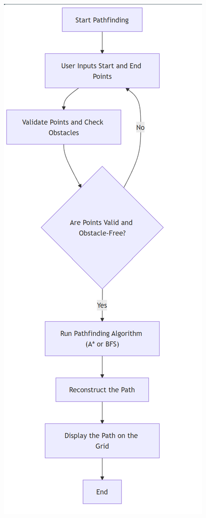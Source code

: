 \newpage

\begin{figure}[!htbp]
	\centering %
	
	\begin{minipage}{0.48\textwidth} %
		\centering
		\includegraphics[width=\linewidth]{Images/pfoutline.png} %

\end{minipage}
\end{figure}
